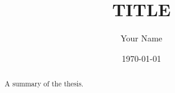 \documentclass[12pt,oneside]{report}
\title{{{TITLE}}}
\author{Your Name}
\date{\today}
\begin{document}
\maketitle

\begin{abstract}
A summary of the thesis.
\end{abstract}

\tableofcontents







\end{document}

